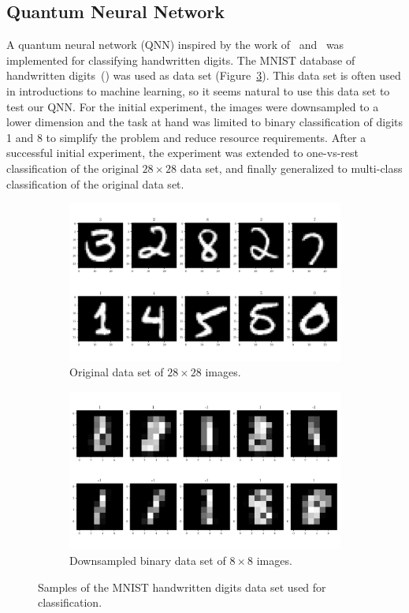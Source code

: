 \documentclass[a4paper,10pt]{article}
\begin{document}
\subsection{Quantum Neural Network}
A quantum neural network (QNN) inspired by the work of~\textcite{qnn-near-term} and~\textcite{perez2019data} was implemented for classifying handwritten digits.
The MNIST database of handwritten digits~(\cite{mnist-digits}) was used as data set (Figure~\ref{fig:mnist}).
This data set is often used in introductions to machine learning, so it seems natural to use this data set to test our QNN.
For the initial experiment, the images were downsampled to a lower dimension and the task at hand was limited to binary classification of digits 1 and 8 to simplify the problem and reduce resource requirements.
After a successful initial experiment, the experiment was extended to one-vs-rest classification of the original $28 \times 28$ data set, and finally generalized to multi-class classification of the original data set.
\begin{figure}[ht]
	\centering
	\begin{subfigure}{.5\textwidth}
		\centering
		\includegraphics[width=.925\linewidth]{figures/mnist_28x28.pdf}
		\caption{Original data set of $28 \times 28$ images.}
		\label{fig:mnist_28x28}
	\end{subfigure}%
	\begin{subfigure}{.5\textwidth}
		\centering
		\includegraphics[width=.925\linewidth]{figures/mnist_8x8.pdf}
		\caption{Downsampled binary data set of $8 \times 8$ images.}
		\label{fig:mnist_8x8}
	\end{subfigure}
	\caption{Samples of the MNIST handwritten digits data set used for classification.}
	\label{fig:mnist}
\end{figure}
\end{document}
